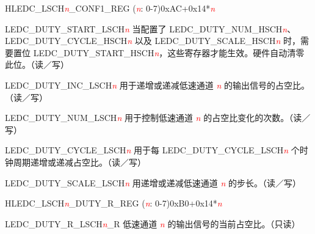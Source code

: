 \begin{register}{H}{LEDC\_LSCH\textit{\textcolor{red}{\it{n}}}\_CONF1\_REG (\textit{\textcolor{red}{\it{n}}}: 0-7)}{0xAC+0x14*\textit{\textcolor{red}{\it{n}}}}\label{regdesc:LEDCLSCHnCONF1REG}
%
%
%
%
%
\regnewline%
\begin{regdesc}\begin{reglist}
\item [LEDC\_DUTY\_START\_LSCH\textcolor{red}{\it{n}}]\label{regdesc:LEDCDUTYSTARTLSCHn} 当配置了 LEDC\_DUTY\_NUM\_HSCH\textcolor{red}{\it{n}}、LEDC\_DUTY\_CYCLE\_HSCH\textcolor{red}{\it{n}} 以及 LEDC\_DUTY\_SCALE\_HSCH\textcolor{red}{\it{n}} 时，需要置位 LEDC\_DUTY\_START\_HSCH\textcolor{red}{\it{n}}，这些寄存器才能生效。硬件自动清零此位。（读／写）
\item [LEDC\_DUTY\_INC\_LSCH\textcolor{red}{\it{n}}]\label{regdesc:LEDCDUTYINCLSCHn} 用于递增或递减低速通道 \textcolor{red}{\it{n}} 的输出信号的占空比。（读／写）
\item [LEDC\_DUTY\_NUM\_LSCH\textcolor{red}{\it{n}}]\label{regdesc:LEDCDUTYNUMLSCHn} 用于控制低速通道 \textcolor{red}{\it{n}} 的占空比变化的次数。（读／写）
\item [LEDC\_DUTY\_CYCLE\_LSCH\textcolor{red}{\it{n}}]\label{regdesc:LEDCDUTYCYCLELSCHn} 用于每 LEDC\_DUTY\_CYCLE\_LSCH\textcolor{red}{\it{n}} 个时钟周期递增或递减占空比。（读／写）
\item [LEDC\_DUTY\_SCALE\_LSCH\textcolor{red}{\it{n}}]\label{regdesc:LEDCDUTYSCALELSCHn} 用递增或递减低速通道 \textcolor{red}{\it{n}} 的步长。（读／写）
\end{reglist}\end{regdesc}
\end{register}


\begin{register}{H}{LEDC\_LSCH\textit{\textcolor{red}{\it{n}}}\_DUTY\_R\_REG (\textit{\textcolor{red}{\it{n}}}: 0-7)}{0xB0+0x14*\textit{\textcolor{red}{\it{n}}}}\label{regdesc:LEDCLSCHnDUTYRREG}
%
%
\regnewline%
\begin{regdesc}\begin{reglist}
\item [LEDC\_DUTY\_R\_LSCH\textcolor{red}{\it{n}}\_R] 低速通道 \textcolor{red}{\it{n}} 的输出信号的当前占空比。（只读）
\end{reglist}\end{regdesc}
\end{register}


